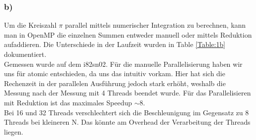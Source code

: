 \documentclass{report}
\begin{document}
        \subsubsection{b)}
        Um die Kreiszahl $\pi$ parallel mittels numerischer Integration zu berechnen, kann man in OpenMP die einzelnen Summen entweder manuell oder mittels Reduktion aufaddieren. Die Unterschiede in der Laufzeit wurden in Table \ref{Table:1b} dokumentiert.\\
        Gemessen wurde auf dem i82sn02. Für die manuelle Parallelisierung haben wir uns für atomic entschieden, da uns das intuitiv vorkam. Hier hat sich die Rechenzeit in der parallelen Ausführung jedoch stark erhöht, weshalb die Messung nach der Messung mit 4 Threads beendet wurde. Für das Parallelisieren mit Reduktion ist das maximales Speedup $ \sim 8 $.\\
        Bei 16 und 32 Threads verschlechtert sich die Beschleunigung im Gegensatz zu 8 Threads bei kleineren N. Das könnte am Overhead der Verarbeitung der Threads liegen.
\end{document}
